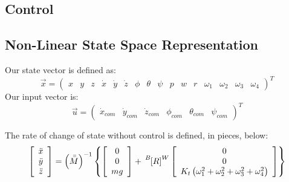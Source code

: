 \documentclass{article}
\numberwithin{equation}{section}
\newcommand{\BtoW}{
\tensor[^B]{\left[R\right]}{^W}
}
\begin{document}
  \subsection{Control}
  
  \subsection{Non-Linear State Space Representation}
    Our state vector is defined as:
    \begin{equation}
      \label{stateVecEqn}
      \vec{x} = \left( \begin{array}{cccccccccccccccc}x&y&z& \dot{x}& \dot{y}& \dot{z}& \phi& \theta&
       \psi& p &w &r&\omega_1&\omega_2&\omega_3&\omega_4\end{array} \right)^T
    \end{equation}
    Our input vector is:
    \begin{equation}
      \label{inputVecEqn}
      \vec{u} = \left(\begin{array}{cccccc}\dot{x}_{com} &\dot{y}_{com}& \dot{z}_{com}& \phi_{com}& \theta_{com}& \psi_{com}\end{array}\right)^T
    \end{equation}
    
    The rate of change of state without control is defined, in pieces, below:
    \begin{equation}
    \label{linAccelStateStep}
    \left[\begin{array}{c} \ddot{x} \\
    				   \ddot{y} \\
				   \ddot{z} \end{array} \right]
				   =
				   \left(\bar{\bar{M}}\right)^{-1}\left\{\left[ \begin{array}{ccc}
          0 \\
          0 \\
          mg \end{array} \right]
          +
    \BtoW \left[\begin{array}{ccc}
         0 \\
         0 \\
         K_t\left(\omega_1^2 + \omega_2^2 + \omega_3^2 + \omega_4^2\right)
         \end{array}\right]
\right\}
\end{equation}
\end{document}

